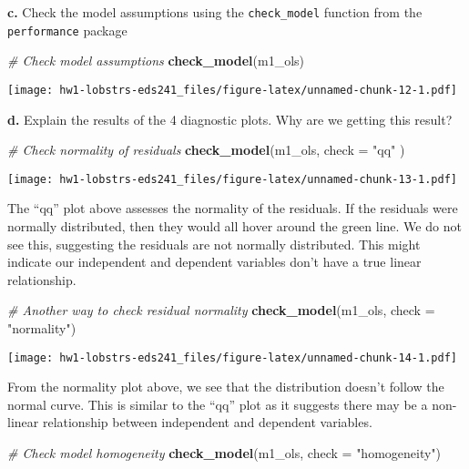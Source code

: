 \documentclass[
]{article}
\newenvironment{Shaded}{\begin{snugshade}}{\end{snugshade}}
\newcommand{\AttributeTok}[1]{\textcolor[rgb]{0.13,0.29,0.53}{#1}}
\newcommand{\CommentTok}[1]{\textcolor[rgb]{0.56,0.35,0.01}{\textit{#1}}}
\newcommand{\FunctionTok}[1]{\textcolor[rgb]{0.13,0.29,0.53}{\textbf{#1}}}
\newcommand{\NormalTok}[1]{#1}
\newcommand{\StringTok}[1]{\textcolor[rgb]{0.31,0.60,0.02}{#1}}
\begin{document}
\textbf{c.} Check the model assumptions using the \texttt{check\_model}
function from the \texttt{performance} package

\begin{Shaded}
\begin{Highlighting}[]
\CommentTok{\# Check model assumptions }
\FunctionTok{check\_model}\NormalTok{(m1\_ols)}
\end{Highlighting}
\end{Shaded}

\texttt{[image: hw1-lobstrs-eds241\_files/figure-latex/unnamed-chunk-12-1.pdf]}

\textbf{d.} Explain the results of the 4 diagnostic plots. Why are we
getting this result?

\begin{Shaded}
\begin{Highlighting}[]
\CommentTok{\# Check normality of residuals}
\FunctionTok{check\_model}\NormalTok{(m1\_ols,  }\AttributeTok{check =} \StringTok{"qq"}\NormalTok{ )}
\end{Highlighting}
\end{Shaded}

\texttt{[image: hw1-lobstrs-eds241\_files/figure-latex/unnamed-chunk-13-1.pdf]}

The ``qq'' plot above assesses the normality of the residuals. If the
residuals were normally distributed, then they would all hover around
the green line. We do not see this, suggesting the residuals are not
normally distributed. This might indicate our independent and dependent
variables don't have a true linear relationship.

\begin{Shaded}
\begin{Highlighting}[]
\CommentTok{\# Another way to check residual normality}
\FunctionTok{check\_model}\NormalTok{(m1\_ols, }\AttributeTok{check =} \StringTok{"normality"}\NormalTok{)}
\end{Highlighting}
\end{Shaded}

\texttt{[image: hw1-lobstrs-eds241\_files/figure-latex/unnamed-chunk-14-1.pdf]}

From the normality plot above, we see that the distribution doesn't
follow the normal curve. This is similar to the ``qq'' plot as it
suggests there may be a non-linear relationship between independent and
dependent variables.

\begin{Shaded}
\begin{Highlighting}[]
\CommentTok{\# Check model homogeneity }
\FunctionTok{check\_model}\NormalTok{(m1\_ols, }\AttributeTok{check =} \StringTok{"homogeneity"}\NormalTok{)}
\end{Highlighting}
\end{Shaded}
\end{document}
